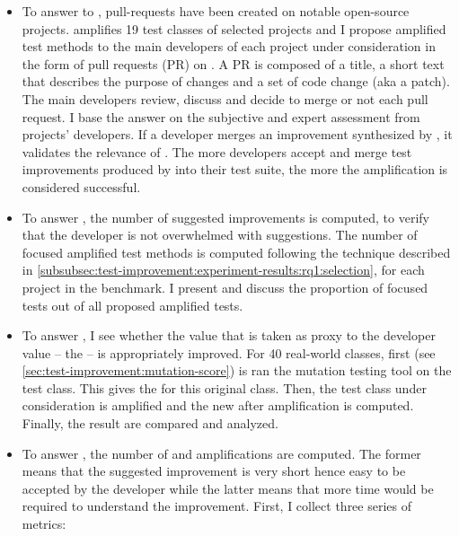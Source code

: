\begin{itemize}
	\item \textbf{\rqpullrequest}
	To answer to \rqpullrequest, pull-requests have been created on notable open-source projects.
	\dspot amplifies 19 test classes of selected projects and I propose amplified test methods to the main developers of each project under consideration in the form of pull requests (PR) on \gh.
	A PR is composed of a title, a short text that describes the purpose of changes and a set of code change (aka a patch).
	The main developers review, discuss and decide to merge or not each pull request.
	I base the answer on the subjective and expert assessment from projects' developers.
	If a developer merges an improvement synthesized by \dspot, it validates the relevance of \dspot.
	The more developers accept and merge test improvements produced by \dspot into their test suite, the more the amplification is considered successful.
	
	\item \textbf{\rqcandidates}
	To answer \rqcandidates, the number of suggested improvements is computed, to verify that the developer is not overwhelmed with suggestions.
	The number of focused amplified test methods is computed following the technique described in \autoref{subsubsec:test-improvement:experiment-results:rq1:selection}, for each project in the benchmark.
	I present and discuss the proportion of focused tests out of all proposed amplified tests.
	
	\item \textbf{\rqeffectiveness}
	To answer \rqeffectiveness, I see whether the value that is taken as proxy to the developer value -- the \ms -- is appropriately improved.
	For 40 real-world classes, first \pitest (see \autoref{sec:test-improvement:mutation-score}) is ran the mutation testing tool on the test class. 
	This gives the \ams for this original class. 
	Then, the test class under consideration is amplified and the new \ams after amplification is computed. 
	Finally, the result are compared and analyzed.
	
	\item \textbf{\rqAmplVersusIAmpl}
	To answer \rqAmplVersusIAmpl, the number of \Aampl and \Iampl amplifications are computed. 
	The former means that the suggested improvement is very short hence easy to be accepted by the developer while the latter means that more time would be required to understand the improvement.
	First, I collect three series of metrics: 
	

\end{itemize}
